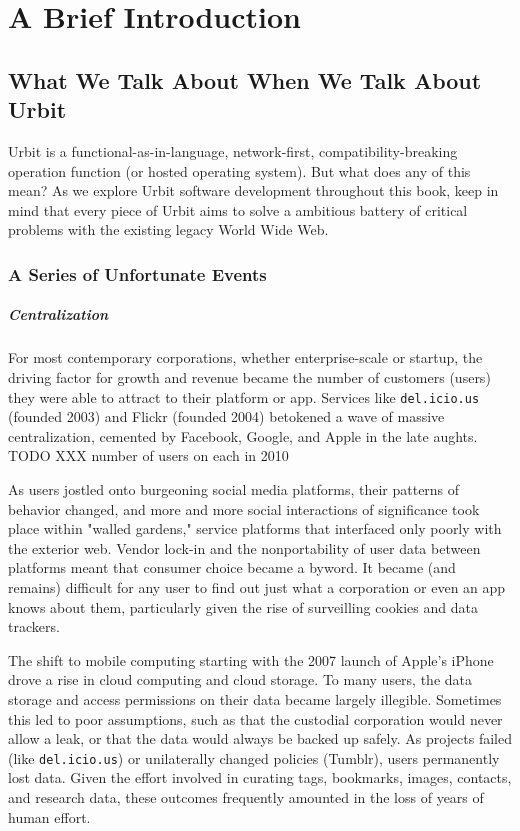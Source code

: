\setchapterpreamble[u]{\margintoc}
\chapter{A Brief Introduction}


\section{What We Talk About When We Talk About Urbit}

Urbit is a functional-as-in-language, network-first, compatibility-breaking
operation function (or hosted operating system).  But what does any of this mean?  As we explore Urbit software development throughout this book, keep in mind that every piece of Urbit aims to solve a ambitious battery of critical problems with the existing legacy World Wide Web.

\subsection{A Series of Unfortunate Events}

\paragraph{Centralization}

For most contemporary corporations, whether enterprise-scale or startup, the driving factor for growth and revenue became the number of customers (users) they were able to attract to their platform or app.  Services like \texttt{del.icio.us} (founded 2003) and Flickr (founded 2004) betokened a wave of massive centralization, cemented by Facebook, Google, and Apple in the late aughts.  TODO XXX number of users on each in 2010

As users jostled onto burgeoning social media platforms, their patterns of behavior changed, and more and more social interactions of significance took place within "walled gardens," service platforms that interfaced only poorly with the exterior web.  Vendor lock-in and the nonportability of user data between platforms meant that consumer choice became a byword.  It became (and remains) difficult for any user to find out just what a corporation or even an app knows about them, particularly given the rise of surveilling cookies and data trackers.

The shift to mobile computing starting with the 2007 launch of Apple's iPhone drove a rise in cloud computing and cloud storage.  To many users, the data storage and access permissions on their data became largely illegible.  Sometimes this led to poor assumptions, such as that the custodial corporation would never allow a leak, or that the data would always be backed up safely.  As projects failed (like \texttt{del.icio.us}) or unilaterally changed policies (Tumblr), users permanently lost data.  Given the effort involved in curating tags, bookmarks, images, contacts, and research data, these outcomes frequently amounted in the loss of years of human effort.

